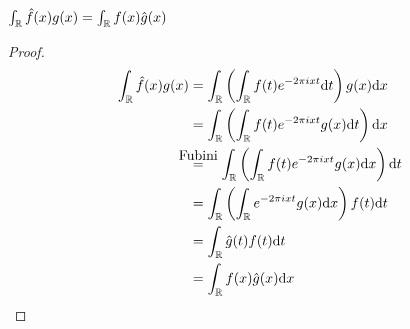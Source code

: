 $\int_{\mathbb{R}} \hat{f}(x)g(x) = \int_{\mathbb{R}}f(x)\hat{g}(x)$
\begin{proof}
    \begin{align*}
        \intreal  \hat{f}(x)g(x) &= \intreal \pars{\intreal f(t) e^{-2\pi i x t}\dd t}g(x)\dd x\\
        &= \intreal \pars{\intreal f(t) e^{-2\pi i x t}g(x)\dd t}\dd x\\
        &\stackrel{\mathclap{\normalfont\mbox{Fubini}}}{=} \quad \intreal \pars{\intreal f(t) e^{-2\pi i x t}g(x)\dd x}\dd t\\
        &= \intreal \pars{\intreal e^{-2\pi i x t}g(x)\dd x} f(t)\dd t\\
        &= \intreal \hat{g}(t) f(t) \dd t\\
        &= \intreal f(x)\hat{g}(x) \dd x
    \end{align*}
\end{proof}